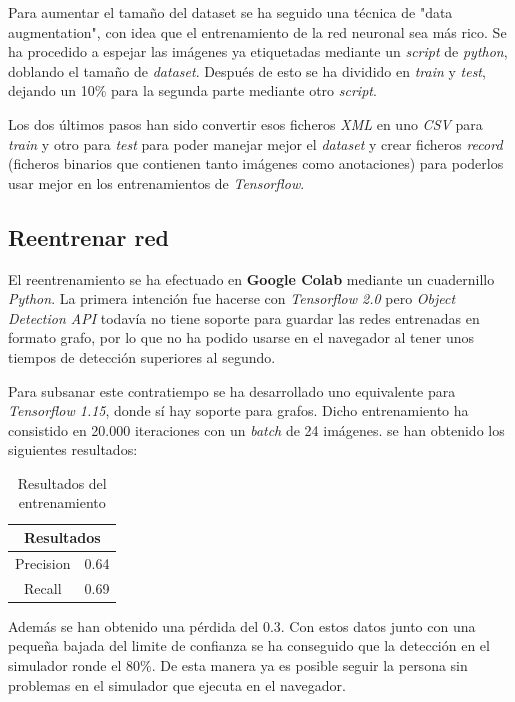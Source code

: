 Para aumentar el tamaño del dataset se ha seguido una técnica de "data augmentation", con idea que el entrenamiento de la red neuronal sea más rico. Se ha procedido  a espejar las imágenes ya etiquetadas mediante un \textit{script} de \textit{python}, doblando el tamaño de \textit{dataset}. Después de esto se ha dividido en \textit{train} y \textit{test}, dejando un 10\% para la segunda parte mediante otro \textit{script}.

Los dos últimos pasos han sido convertir esos ficheros \textit{XML} en uno \textit{CSV} para \textit{train} y otro para \textit{test} para poder manejar mejor el \textit{dataset} y crear ficheros \textit{record} (ficheros binarios que contienen tanto imágenes como anotaciones) para poderlos usar mejor en los entrenamientos de \textit{Tensorflow}.
\subsection*{Reentrenar red}
El reentrenamiento se ha efectuado en \textbf{Google Colab} mediante un cuadernillo \textit{Python}. La primera intención fue hacerse con \textit{Tensorflow 2.0} pero \textit{Object Detection API} todavía no tiene soporte para guardar las redes entrenadas en formato grafo, por lo que no ha podido usarse en el navegador al tener unos tiempos de detección superiores al segundo.

Para subsanar este contratiempo se ha desarrollado uno equivalente para \textit{Tensorflow 1.15}, donde sí hay soporte para grafos. Dicho entrenamiento ha consistido en 20.000 iteraciones con un \textit{batch} de 24 imágenes.
se han obtenido los siguientes resultados: 
\begin{table}[H]
\centering
\begin{tabular}{|c|c|}

\multicolumn{2}{c}{\textbf{Resultados}} \\ \hline
Precision             & 0.64            \\ \hline
Recall                & 0.69            \\ \hline
\end{tabular}
\caption{Resultados del entrenamiento}
\label{tab:cambios_python_2_3}
\end{table}

Además se han obtenido una pérdida del 0.3. Con estos datos junto con una pequeña bajada del limite de confianza se ha conseguido que la detección en el simulador ronde el 80\%. De esta manera ya es posible seguir la persona sin problemas en el simulador que ejecuta en el navegador.

